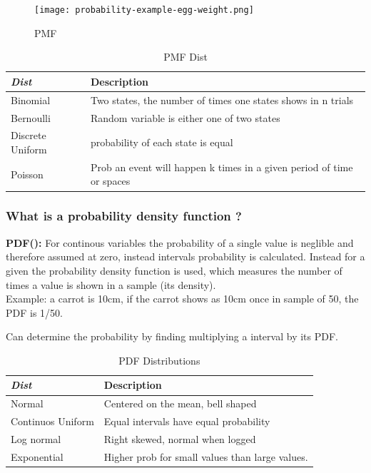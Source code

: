 \documentclass[11pt]{scrartcl} %
\begin{document}
\begin{figure}[h] %
	\centering
	\texttt{[image: probability-example-egg-weight.png]} %
	\caption{PMF}
\end{figure}

\begin{table}[h] %
	\centering %
	\begin{tabular}{l l}
		\toprule
		\textit{Dist} & \textbf{Description} \\
		\midrule
		Binomial & Two states, the number of times one states shows in n trials \\
		Bernoulli & Random variable is either one of two states \\
		Discrete Uniform & probability of each state is equal \\
		Poisson & Prob an event will happen k times in a given period of time or spaces \\
		\bottomrule
	\end{tabular}
	\caption{PMF Dist}
\end{table}

\subsubsection{What is a probability density function ?}

\textbf{PDF():} For continous variables the probability of a single value is neglible and therefore
assumed at zero, instead intervals probability is calculated. Instead for a given the probability density function is used,
which measures the number of times a value is shown in a sample (its density).\\

Example: a carrot is 10cm, if the carrot shows as 10cm once in sample of 50, the PDF is 1/50.

Can determine the probability by finding multiplying a interval by its PDF.

\begin{table}[h] %
	\centering %
	\begin{tabular}{l l}
		\toprule
		\textit{Dist} & \textbf{Description} \\
		\midrule
		Normal & Centered on the mean, bell shaped\\
		Continuos Uniform & Equal intervals have equal probability \\
		Log normal & Right skewed, normal when logged \\
		Exponential & Higher prob for small values than large values.\\
		\bottomrule
	\end{tabular}
	\caption{PDF Distributions}
\end{table}
\end{document}
